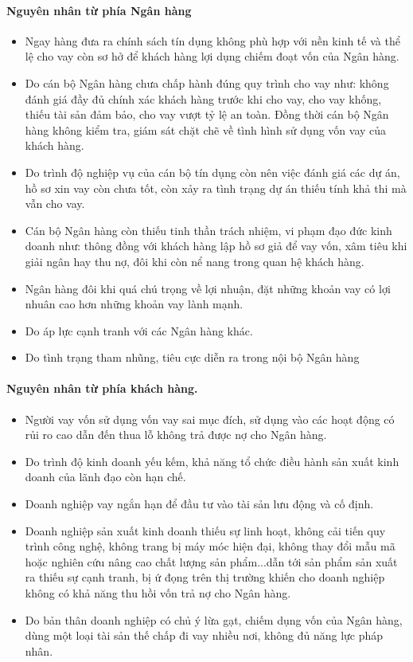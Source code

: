 \paragraph{Nguyên nhân từ phía Ngân hàng}
\begin{itemize}
\item Ngay hàng đưa ra chính sách tín dụng không phù hợp với nền kinh tế và thể lệ cho vay còn sơ hở để khách hàng lợi dụng chiếm đoạt vốn của Ngân hàng.
\item Do cán bộ Ngân hàng chưa chấp hành đúng quy trình cho vay như: không đánh giá đầy đủ chính xác khách hàng trước khi cho vay, cho vay khống, thiếu tài sản đảm bảo, cho vay vượt tỷ lệ an toàn. Đồng thời cán bộ Ngân hàng không kiểm tra, giám sát chặt chẽ về tình hình sử dụng vốn vay của khách hàng.
\item Do trình độ nghiệp vụ của cán bộ tín dụng còn nên việc đánh giá các dự án, hồ sơ xin vay còn chưa tốt, còn xảy ra tình trạng dự án thiếu tính khả thi mà vẫn cho vay.
\item Cán bộ Ngân hàng còn thiếu tinh thần trách nhiệm, vi phạm đạo đức kinh doanh như: thông đồng với khách hàng lập hồ sơ giả để vay vốn, xâm tiêu khi giải ngân hay thu nợ, đôi khi còn nể nang trong quan hệ khách hàng.
\item Ngân hàng đôi khi quá chú trọng về lợi nhuận, đặt những khoản vay có lợi nhuân cao hơn những khoản vay lành mạnh.
\item Do áp lực cạnh tranh với các Ngân hàng khác.
\item Do tình trạng tham nhũng, tiêu cực diễn ra trong nội bộ Ngân hàng
\end{itemize}

\paragraph{Nguyên nhân từ phía khách hàng.}

\begin{itemize}
\item Người vay vốn sử dụng vốn vay sai mục đích, sử dụng vào các hoạt động có rủi ro cao dẫn đến thua lỗ không trả được nợ cho Ngân hàng.
\item Do trình độ kinh doanh yếu kếm, khả năng tổ chức điều hành sản xuất kinh doanh của lãnh đạo còn hạn chế.
\item Doanh nghiệp vay ngắn hạn để đầu tư vào tài sản lưu động và cố định.
\item Doanh nghiệp sản xuất kinh doanh thiếu sự linh hoạt, không cải tiến quy trình công nghệ, không trang bị máy móc hiện đại, không thay đổi mẫu mã hoặc nghiên cứu nâng cao chất lượng sản phẩm...dẫn tới sản phẩm sản xuất ra thiếu sự cạnh tranh, bị ứ đọng trên thị trường khiến cho doanh nghiệp không có khả năng thu hồi vốn trả nợ cho Ngân hàng.
\item Do bản thân doanh nghiệp có chủ ý lừa gạt, chiếm dụng vốn của Ngân hàng, dùng một loại tài sản thế chấp đi vay nhiều nơi, không đủ năng lực pháp nhân.
\end{itemize}
  
